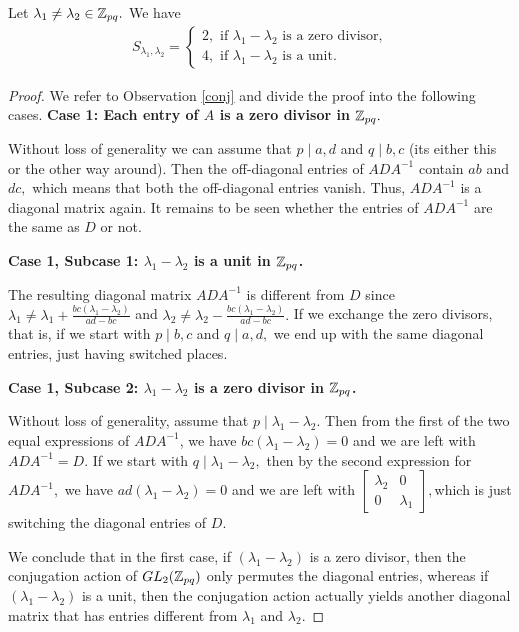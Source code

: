 \documentclass[11pt, titlepage, a4paper]{article}
\begin{document}
\begin{theorem}
Let $\lambda_{1}\neq \lambda_{2} \in \mathbb{Z}_{pq}.$ We have 
 \begin{align*}
 S_{\lambda_{1},\lambda_{2}} = 
\begin{cases}
 2, \text{ if } \lambda_{1}-\lambda_{2} \text{ is a zero divisor,} \\
 4,  \text{ if } \lambda_{1}-\lambda_{2} \text{ is a unit.}
\end{cases}
\end{align*}
\end{theorem}
\begin{proof}
 We refer to Observation \ref{conj} and divide the proof into the following cases.
 \textbf{Case 1: Each entry of $A$ is a zero divisor in $\mathbb{Z}_{pq}.$} 

Without loss of generality we can assume that $p \mid a,d$ and $q\mid b,c$ (its either this or the other way around). Then the off-diagonal entries of $ADA^{-1}$ contain $ab$ and $dc,$ which means that both the off-diagonal entries vanish. Thus, $ADA^{-1}$ is a diagonal matrix again. It remains to be seen whether the entries of $ADA^{-1}$ are the same as $D$ or not.

\textbf{Case 1, Subcase 1: $\lambda_{1}-\lambda_{2}$ is a unit in $\mathbb{Z}_{pq}$.}

The resulting diagonal matrix $ADA^{-1}$ is different from $D$ since $\lambda_{1} \neq  \lambda_{1} + \frac{bc(\lambda_{1}-\lambda_{2})}{ad-bc}$ and $\lambda_{2}\neq  \lambda_{2} - \frac{bc(\lambda_{1}-\lambda_{2})}{ad-bc}.$ If we exchange the zero divisors, that is, if we start with $p \mid b,c$ and $q\mid a,d,$ we end up with the same diagonal entries, just having switched places. 

\textbf{Case 1, Subcase 2: $\lambda_{1}-\lambda_{2}$ is a zero divisor in $\mathbb{Z}_{pq}$.}

Without loss of generality, assume that $p\mid \lambda_{1}-\lambda_{2}.$ Then from the first of the two equal expressions of $ADA^{-1}$, we have $bc(\lambda_{1}-\lambda_{2})=0$ and we are left with $ADA^{-1}=D.$ If we start with $q\mid \lambda_{1}-\lambda_{2},$ then by the second expression for $ADA^{-1},$ we have $ad(\lambda_{1}-\lambda_{2})=0$ and we are left with $
\begin{bmatrix}
 \lambda_{2}& 0 \\
 0 & \lambda_{1}
\end{bmatrix},
$which is just switching the diagonal entries of $D.$ 

We conclude that in the first case, if $(\lambda_{1}-\lambda_{2})$ is a zero divisor, then the conjugation action of $GL_{2}(\mathbb{Z}_{pq})$ only permutes the diagonal entries, whereas if $(\lambda_{1}-\lambda_{2})$ is a unit, then the conjugation action actually yields another diagonal matrix that has entries different from $\lambda_{1}$ and $\lambda_{2}.$


\end{proof}
\end{document}
